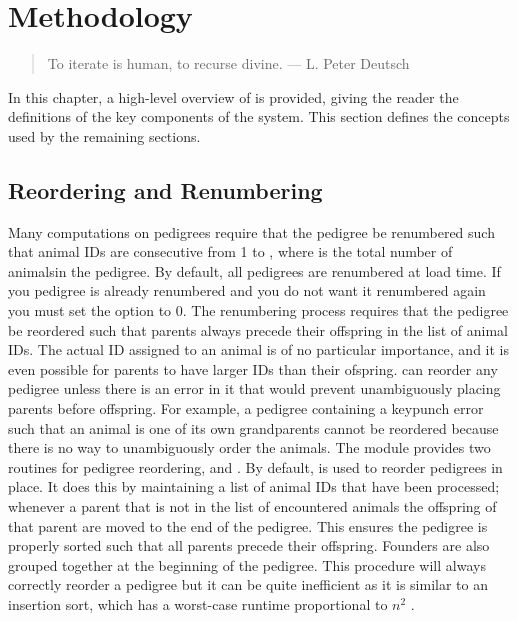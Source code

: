 \chapter{Methodology}
\label{cha:methodology}
\begin{quote}
To iterate is human, to recurse divine. --- L. Peter Deutsch
\end{quote}
In this chapter, a high-level overview of \PYPEDAL{} is provided, giving
the reader the definitions of the key components of the system. This section
defines the concepts used by the remaining sections.
\section{Reordering and Renumbering}\label{sec:methodology-reordering-and-renumbering}
Many computations on pedigrees require that the pedigree be renumbered such that animal IDs are consecutive from 1 to , where  is the total number of animalsin the pedigree. By default, all pedigrees are renumbered at load time. If you pedigree is already renumbered and you do not want it renumbered again you must set the  option to 0. The renumbering process requires that the pedigree be reordered such that parents always precede their offspring in the list of animal IDs. The actual ID assigned to an animal is of no particular importance, and it is even possible for parents to have larger IDs than their ofspring.  \PyPedal{} can reorder any pedigree unless there is an error in it that would prevent unambiguously placing parents before offspring.  For example, a pedigree containing a keypunch error such that an animal is one of its own grandparents cannot be reordered because there is no way to unambiguously order the animals.  The  module provides two routines for pedigree reordering,  and .  By default,  is used to reorder pedigrees in place.  It does this by maintaining a list of animal IDs that have been processed; whenever a parent that is not in the  list of encountered animals the offspring of that parent are moved to the end of the pedigree.  This ensures the pedigree is properly sorted such that all parents precede their offspring. Founders are also grouped together at the beginning of the pedigree. This procedure will always correctly reorder a pedigree but it can be quite inefficient as it is similar to an insertion sort, which has a worst-case runtime proportional to $n^{2}$ \cite{Cormen2003}.

